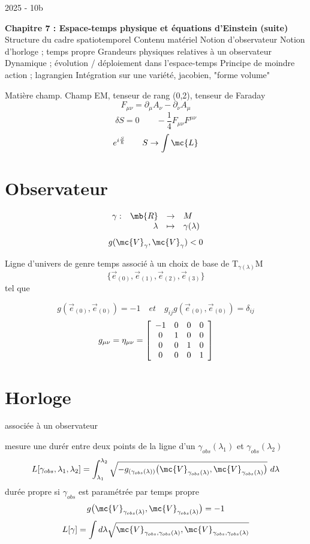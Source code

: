 
2025 - 10b

{\bf Chapitre 7 : Espace-temps physique et équations d'Einstein (suite)}
Structure du cadre spatiotemporel
Contenu matériel
Notion d'observateur
Notion d'horloge ; temps propre
Grandeurs physiques relatives à un observateur
Dynamique ; évolution / déploiement dans l'espace-temps
Principe de moindre action ; lagrangien
Intégration sur une variété, jacobien, "forme volume"

Matière champ. Champ EM, tenseur de rang (0,2), tenseur de Faraday
\[
F_{\mu\nu}=\partial_\mu A_\nu-\partial_\nu A_\mu
\]
\[
\delta S=0\qquad-\frac{1}{4}F_{\mu\nu} F^{\mu\nu}
\]
\[
e^{i\frac{S}{\hbar}}\qquad S\to\int \mc{L}
\]
\section{Observateur}
\begin{minipage}[c]{.45\linewidth}
\[
\begin{array}{ c r c l }
 \gamma : & \mb{R} & \to & M \\
  & \lambda & \mapsto & \gamma(\lambda) \\
\end{array}\]
\[
g(\mc{V}_\gamma,\mc{V}_\gamma)<0
\]
\end{minipage}
\hfill
\begin{minipage}[c]{.45\linewidth}
Ligne d'univers de genre temps associé à un choix de base de
T$_{\gamma(\lambda)}$M
\[
\{\vec{e}_{(0)},\vec{e}_{(1)},\vec{e}_{(2)},\vec{e}_{(3)}\}
\]
tel que
\end{minipage}
\[
g(\vec{e}_{(0)},\vec{e}_{(0)})=-1\quad et\quad
g_{ij}g(\vec{e}_{(0)},\vec{e}_{(0)})=\delta_{ij}
\]
\[
g_{\mu\nu}=\eta_{\mu\nu}=\left[
\begin{array}{ c c c c }
 -1 & 0 & 0 & 0 \\
  0 & 1 & 0 & 0 \\
  0 & 0 & 1 & 0 \\
  0 & 0 & 0 & 1 \\
\end{array}\right]
\]
\section{Horloge}
associée à un observateur

mesure une durér entre deux points de la ligne d'un $\gamma_{obs}(\lambda_1)$
et $\gamma_{obs}(\lambda_2)$
\[
L[\gamma_{obs},\lambda_1,\lambda_2]=\int^{\lambda_2}_{\lambda_1}
\sqrt{-g_{(\gamma_{obs}(\lambda))}\big(\mc{V}_{\gamma_{obs}(\lambda)},
\mc{V}_{\gamma_{obs}(\lambda)}\big)}\ d\lambda
\]
durée propre \qquad si $\gamma_{obs}$ est paramétrée par temps propre
\[
g\big(\mc{V}_{\gamma_{obs}(\lambda)},\mc{V}_{\gamma_{obs}(\lambda)}\big)=-1
\]
\[
L[\gamma]=\int d\lambda\sqrt{\mc{V}_{\gamma_{obs},\gamma_{obs}(\lambda)},
\mc{V}_{\gamma_{obs},\gamma_{obs}(\lambda)}}
\]
